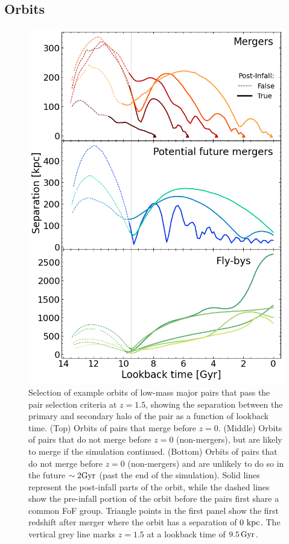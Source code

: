 \documentclass[twocolumn,linenumbers]{aastex631}
\begin{document}
\subsection{Orbits} 
\begin{figure}[tb]
    \begin{center}
    \includegraphics[width=\columnwidth]{plots/bet-on-it/5_exampleorbits.png}
    \caption{Selection of example orbits of low-mass major pairs that pass the pair selection criteria at $z=1.5$, showing the separation between the primary and secondary halo of the pair as a function of lookback time. 
    (Top) Orbits of pairs that merge before $z=0$.
    (Middle) Orbits of pairs that do not merge before $z=0$ (non-mergers), but are likely to merge if the simulation continued. 
    (Bottom) Orbits of pairs that do not merge before $z=0$ (non-mergers) and are unlikely to do so in the future $\sim2\mathrm{Gyr}$ (past the end of the simulation).
    Solid lines represent the post-infall parts of the orbit, while the dashed lines show the pre-infall portion of the orbit before the pairs first share a common FoF group. 
    Triangle points in the first panel show the first redshift after merger where the orbit has a separation of $0\,\mathrm{\,kpc}$.
    The vertical grey line marks $z=1.5$ at a lookback time of $9.5\,\mathrm{Gyr}$. 
    }
    \label{fig:example-orbits}
    \end{center}
\end{figure}
\end{document}
